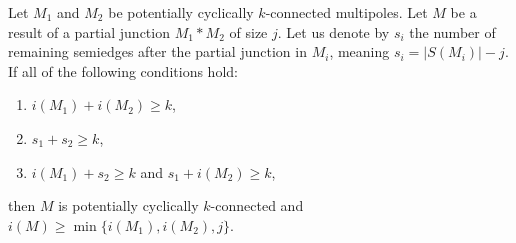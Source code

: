 \documentclass[12pt, twoside]{book}
\begin{document}
\begin{theorem}\label{th:connecting-potentially-cyclically-connected-with-number-of-resulting-semiedges}
	Let $M_1$ and $M_2$ be potentially cyclically $k$-connected multipoles. Let $M$ be a result of a partial junction $M_1*M_2$ of size $j$. Let us denote by $s_i$ the number of remaining semiedges after the partial junction in $M_i$, meaning ${s_i=|S(M_i)|-j}$. If all of the following conditions hold:
	\begin{enumerate}[label=(\roman*)]
		\item $i(M_1)+i(M_2)\geq k$,
		\item $s_1+s_2\geq k$,
		\item $i(M_1)+s_2\geq k$ and $s_1+i(M_2)\geq k$,
	\end{enumerate}
	then $M$ is potentially cyclically $k$-connected and $i(M)\geq \min\{i(M_1), i(M_2), j\}$.
\end{theorem}
\end{document}
